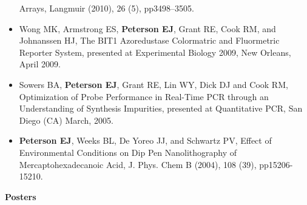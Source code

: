 \begin{itemize}
  Arrays, Langmuir (2010), 26 (5), pp3498--3505.
\item
  Wong MK, Armstrong ES, \textbf{Peterson EJ}, Grant RE, Cook RM, and
  Johnanssen HJ, The BIT1 Azoredustase Colormatric and Fluormetric
  Reporter System, presented at Experimental Biology 2009, New Orleans,
  April 2009.
\item
  Sowers BA, \textbf{Peterson EJ}, Grant RE, Lin WY, Dick DJ and Cook
  RM, Optimization of Probe Performance in Real-Time PCR through an
  Understanding of Synthesis Impurities, presented at Quantitative PCR,
  San Diego (CA) March, 2005.
\item
  \textbf{Peterson EJ}, Weeks BL, De Yoreo JJ, and Schwartz PV, Effect
  of Environmental Conditions on Dip Pen Nanolithography of
  Mercaptohexadecanoic Acid, J. Phys. Chem B (2004), 108 (39),
  pp15206-15210.
\end{itemize}

\textbf{Posters}

